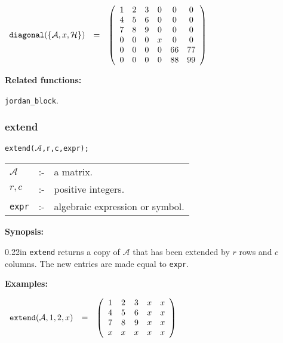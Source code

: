 \begin{flushleft}  
\hspace*{0.1in}
\begin{math}  
\begin{array}{ccc}
{\tt diagonal}(\{\mathcal{A},x,{\cal H}\}) & = & 
\left( \begin{array}{cccccc} 1 & 2 & 3 & 0 & 0 & 0 \\ 4 & 5 & 6 & 0 & 0
& 0 \\ 7 & 8 & 9 & 0 & 0 & 0 \\ 0 & 0 & 0 & x & 0 & 0 \\ 0 & 0 & 0 & 0 
& 66 & 77 \\ 0 & 0 & 0 & 0 & 88 & 99 
\end{array} \right)
\end{array}
\end{math}  
\end{flushleft}

{\bf Related functions:} 

\hspace*{0.175in} {\tt jordan\_block}.


\subsubsection{extend}
\label{linalg:extend}


\hspace*{0.175in} {\tt extend($\mathcal{A}$,r,c,expr);}

\hspace*{0.1in} 
\begin{tabular}{l l l}
$\mathcal{A}$ &:-& a matrix. \\
$r,c$              &:-& positive integers. \\
\texttt{expr}      &:-& algebraic expression or symbol.
\end{tabular}

{\bf Synopsis:} %

\begin{addtolength}{\leftskip}{0.22in}
                {\tt extend} returns a copy of $\mathcal{A}$ that has been 
                extended by $r$ rows and $c$ columns. The new entries are
                made equal to \texttt{expr}.

\end{addtolength}

{\bf Examples:}

\begin{flushleft}  
\hspace*{0.1in}
\begin{math}  
\begin{array}{ccc}
{\tt extend}(\mathcal{A},1,2,x) & = & 
\left( \begin{array}{ccccc} 1 & 2 & 3 & x & x \\ 4 & 5 & 6 & x & x
\\ 7 & 8 & 9 & x & x \\ x & x & x & x & x 
\end{array} \right)
\end{array}
\end{math}  
\end{flushleft}

